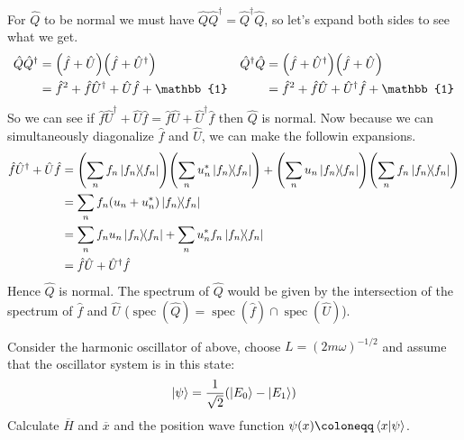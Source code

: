 \documentclass[boxes,pages]{homework}
\makeatletter
\newcommand{\herm}[1]{{{#1}^\dagger}}
\DeclareMathOperator{\spec}{spec}
\numberwithin{@problem}{section}
\makeatother
\begin{document}
\begin{solution}
	For $\hat{Q}$ to be normal we must have $\hat{Q}\herm{\hat{Q}} = \herm{\hat{Q}}\hat{Q}$, so let's expand both sides to see what we get.
	\begin{align*}
		\hat{Q}\herm{\hat{Q}} & = \qty(\hat{f} + \hat{U})\qty(\hat{f} + \herm{\hat{U}})           & \herm{\hat{Q}}\hat{Q} & = \qty(\hat{f} + \herm{\hat{U}})\qty(\hat{f} + \hat{U})           \\
		                      & = \hat{f}^2 + \hat{f}\herm{\hat{U}} + \hat{U}\hat{f} + \mathbb{1} &                       & = \hat{f}^2 + \hat{f}\hat{U} + \herm{\hat{U}}\hat{f} + \mathbb{1}
	\end{align*}
	So we can see if $\hat{f}\herm{\hat{U}} + \hat{U}\hat{f} = \hat{f}\hat{U} + \herm{\hat{U}}\hat{f}$ then $\hat{Q}$ is normal. Now because we can simultaneously diagonalize $\hat{f}$ and $\hat{U}$, we can make the followin expansions.
	\begin{align*}
		\hat{f}\herm{\hat{U}} + \hat{U}\hat{f} & = \qty(\sum_nf_n\ketbra{f_n}{f_n})\qty(\sum_nu_n^*\ketbra{f_n}{f_n}) + \qty(\sum_nu_n\ketbra{f_n}{f_n})\qty(\sum_nf_n\ketbra{f_n}{f_n}) \\
		                                       & = \sum_nf_n\qty(u_n + u_n^*)\ketbra{f_n}{f_n}                                                                                           \\
		                                       & = \sum_nf_nu_n\ketbra{f_n}{f_n} + \sum_n u_n^* f_n\ketbra{f_n}{f_n}                                                                     \\
		                                       & = \hat{f}\hat{U} + \herm{\hat{U}}\hat{f}
	\end{align*}
	Hence $\hat{Q}$ is normal. The spectrum of $\hat{Q}$ would be given by the intersection of the spectrum of $\hat{f}$ and $\hat{U}$ ($\spec(\hat{Q}) = \spec(\hat{f})\cap\spec(\hat{U})$).
\end{solution}

\setcounter{section}{5}

\begin{problem}
Consider the  harmonic oscillator of above, choose $L = (2m\omega)^{-1/2}$ and assume that the oscillator system is in this state:
\begin{equation*}
	\ket{\psi} = \frac{1}{\sqrt{2}}\qty(\ket{E_0} - \ket{E_1})
\end{equation*}
Calculate $\overline{H}$ and $\overline{x}$ and the position wave function $\psi(x)\coloneqq\braket{x}{\psi}$.
\end{problem}
\end{document}
